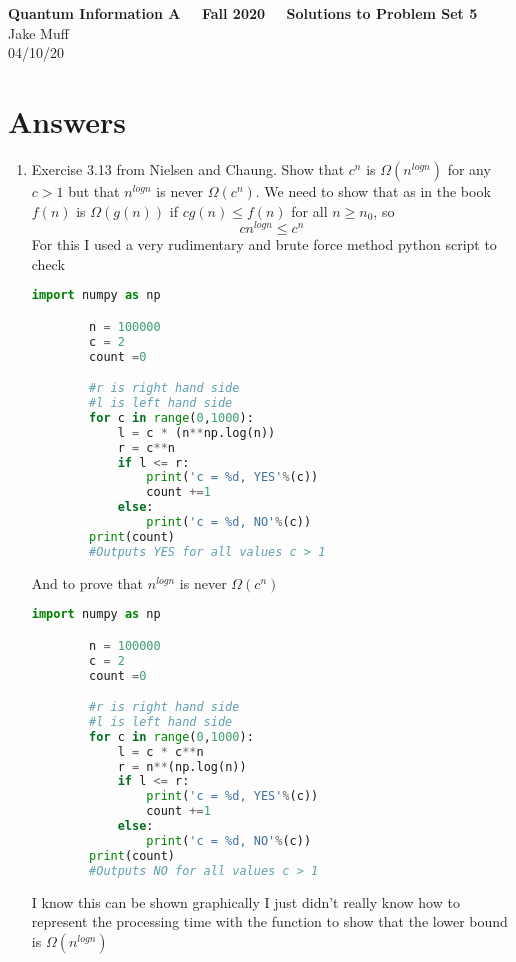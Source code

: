 \documentclass[12pt]{article}
\begin{document}
\normalsize

\baselineskip 14pt

\begin{center}
{\Large {\bf Quantum Information A \ \ Fall 2020 \ \  Solutions to Problem Set 5}} \\
Jake Muff \\
04/10/20
\end{center}

\bigskip
\section{Answers}



\begin{enumerate}
    \item Exercise 3.13 from Nielsen and Chaung. Show that $c^n$ is $\Omega (n^{log n})$ for any $c > 1$ but that $n^{log n} $ is never $\Omega(c^n)$. We need to show that as in the book $f(n)$ is $\Omega (g(n)) $ if $c g(n) \leq f(n)$ for all $n \geq n_0$, so 
    $$ c n^{log n} \leq c^n $$ 
    For this I used a very rudimentary and brute force method python script to check 
    \begin{lstlisting}[language=Python]
        import numpy as np

        n = 100000
        c = 2
        count =0

        #r is right hand side
        #l is left hand side
        for c in range(0,1000):
            l = c * (n**np.log(n))
            r = c**n 
            if l <= r:
                print('c = %d, YES'%(c))
                count +=1
            else:
                print('c = %d, NO'%(c))
        print(count)
        #Outputs YES for all values c > 1
    \end{lstlisting}
    And to prove that $n^{log n}$ is never $\Omega (c^n)$ 
    \begin{lstlisting}[language=Python]
        import numpy as np

        n = 100000
        c = 2
        count =0

        #r is right hand side
        #l is left hand side
        for c in range(0,1000):
            l = c * c**n
            r = n**(np.log(n)) 
            if l <= r:
                print('c = %d, YES'%(c))
                count +=1
            else:
                print('c = %d, NO'%(c))
        print(count)
        #Outputs NO for all values c > 1
    \end{lstlisting}
    I know this can be shown graphically I just didn't really know how to represent the processing time with the function to show that the lower bound is $\Omega (n^{log n})$ 


\end{enumerate}
\end{document}
